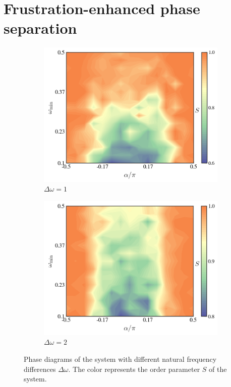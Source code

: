 \documentclass{article}
\begin{document}
\section{\label{sec:behaviors}Frustration-enhanced phase separation}
\begin{figure}
    \centering
    \begin{subfigure}{0.45\textwidth}
        \centering
        \includegraphics[width=1\textwidth]{figs/pd1.png}
        \caption{$\Delta \omega=1$}
        \label{fig:phaseDiagramDeltaOmega1}
    \end{subfigure}
    \begin{subfigure}{0.45\textwidth}
        \centering
        \includegraphics[width=1\textwidth]{figs/pd2.png}
        \caption{$\Delta \omega=2$}
        \label{fig:phaseDiagramDeltaOmega2}
    \end{subfigure}
    \caption{Phase diagrams of the system with different natural frequency differences $\Delta \omega$. The color represents the order parameter $S$ of the system.}
    \label{fig:phaseDiagrams}
\end{figure}
\end{document}
